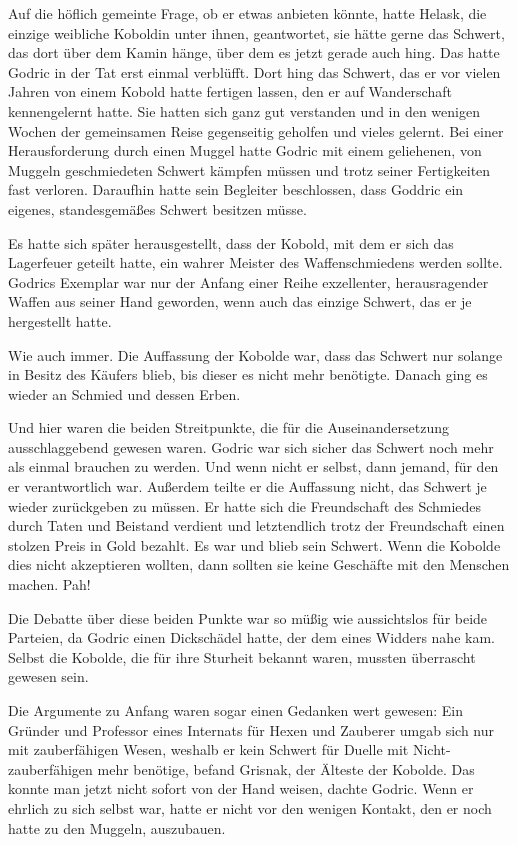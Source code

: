 \documentclass[fontsize=12pt]{scrartcl}
\begin{document}
	Auf die höflich gemeinte Frage, ob er etwas anbieten könnte, hatte Helask, die einzige weibliche Koboldin unter ihnen, geantwortet, sie hätte gerne das Schwert, das dort über dem Kamin hänge, über dem es jetzt gerade auch hing. Das hatte Godric in der Tat erst einmal verblüfft. Dort hing das Schwert, das er vor vielen Jahren von einem Kobold hatte fertigen lassen, den er auf Wanderschaft kennengelernt hatte. Sie hatten sich ganz gut verstanden und in den wenigen Wochen der gemeinsamen Reise gegenseitig geholfen und vieles gelernt. Bei einer Herausforderung durch einen Muggel hatte Godric mit einem geliehenen, von Muggeln geschmiedeten Schwert kämpfen müssen und trotz seiner Fertigkeiten fast verloren. Daraufhin hatte sein Begleiter beschlossen, dass Goddric ein eigenes, standesgemäßes Schwert besitzen müsse. 
	
	Es hatte sich später herausgestellt, dass der Kobold, mit dem er sich das Lagerfeuer geteilt hatte, ein wahrer Meister des Waffenschmiedens werden sollte. Godrics Exemplar war nur der Anfang einer Reihe exzellenter, herausragender Waffen aus seiner Hand geworden, wenn auch das einzige Schwert, das er je hergestellt hatte. 
	
	Wie auch immer. Die Auffassung der Kobolde war, dass das Schwert nur solange in Besitz des Käufers blieb, bis dieser es nicht mehr benötigte. Danach ging es wieder an Schmied und dessen Erben. 
	
	Und hier waren die beiden Streitpunkte, die für die Auseinandersetzung ausschlaggebend gewesen waren. Godric war sich sicher das Schwert noch mehr als einmal brauchen zu werden. Und wenn nicht er selbst, dann jemand, für den er verantwortlich war. Außerdem teilte er die Auffassung nicht, das Schwert je wieder zurückgeben zu müssen. Er hatte sich die Freundschaft des Schmiedes durch Taten und Beistand verdient und letztendlich trotz der Freundschaft einen stolzen Preis in Gold bezahlt. Es war und blieb sein Schwert. Wenn die Kobolde dies nicht akzeptieren wollten, dann sollten sie keine Geschäfte mit den Menschen machen. Pah!
	
	Die Debatte über diese beiden Punkte war so müßig wie aussichtslos für beide Parteien, da Godric einen Dickschädel hatte, der dem eines Widders nahe kam. Selbst die Kobolde, die für ihre Sturheit bekannt waren, mussten überrascht gewesen sein. 
	
	Die Argumente zu Anfang waren sogar einen Gedanken wert gewesen: Ein Gründer und Professor eines Internats für Hexen und Zauberer umgab sich nur mit zauberfähigen Wesen, weshalb er kein Schwert für Duelle mit Nicht-zauberfähigen mehr benötige, befand Grisnak, der Älteste der Kobolde.  Das konnte man jetzt nicht sofort von der Hand weisen, dachte Godric. Wenn er ehrlich zu sich selbst war, hatte er nicht vor den wenigen Kontakt, den er noch hatte zu den Muggeln, auszubauen. 
	
\end{document}
